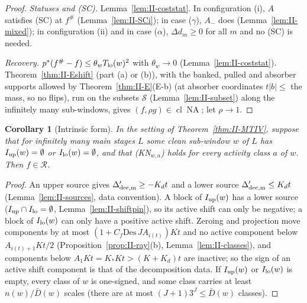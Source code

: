 \documentclass[10pt]{amsart}
\newtheorem{corollary}[theorem]{Corollary}
\theoremstyle{definition}
\theoremstyle{remark}
\newcommand{\NA}{\operatorname{NA}}
\newcommand{\cl}{\operatorname{cl}}
\newcommand{\Rec}{\mathcal R}
\begin{document}
\begin{proof}
\emph{Statuses and (SC).}  Lemma~\ref{lem:II-coststat}.  In configuration (i), $A$
satisfies (SC) at $f^\#$ (Lemma~\ref{lem:II-SCi}); in case ($\gamma$), $A_-$ does
(Lemma~\ref{lem:II-mixed}); in configuration (ii) and in case ($\alpha$), $\Delta d_m\ge0$
for all $m$ and no (SC) is needed.

\emph{Recovery.}  $p^*(f^\#-f)\le\theta_wT_{\rm lo}(w)^2$ with $\theta_w\to0$
(Lemma~\ref{lem:II-coststat}).  Theorem~\ref{thm:II-Eshift} (part (a) or (b)), with
the banked, pulled and absorber supports allowed by Theorem~\ref{thm:II-E}(E-b)
(at absorber coordinates $t|b|\le$ the mass, so no flips), run on the subsets $\mathcal S$
(Lemma~\ref{lem:II-subset}) along the infinitely many sub-windows, gives
$(f,\rho g)\in\cl\NA$; let $\rho\to1$.
\end{proof}

\begin{corollary}[Intrinsic form]\label{cor:II-MTIVintr}
In the setting of Theorem~\textup{\ref{thm:II-MTIV}}, suppose that for infinitely many
main stages $L$ some clean sub-window $w$ of $L$ has $I_{\rm up}(w)=\emptyset$ or $I_{\rm
lo}(w)=\emptyset$, and that \textup{(KN$_{w,a}$)} holds for every activity class $a$ of
$w$.  Then $f\in\Rec$.
\end{corollary}

\begin{proof}
An upper source gives $\Delta'_{\rm dec,m}\ge-K_dt$ and a lower source $\Delta'_{\rm dec,m}\le K_dt$
(Lemma~\ref{lem:II-sources}, data convention).  A block of $I_{\rm up}(w)$ has a lower
source ($I_{\rm up}\cap I_{\rm lo}=\emptyset$, Lemma~\ref{lem:II-shiftpin}), so its active shift can
only be negative; a block of $I_{\rm lo}(w)$ can only have a positive active shift.
Zeroing and projection move components by at most $(1+C_f\mathrm{Des}\,JA_{i(t)})Kt$
and no active component below $A_{i(t)+1}Kt/2$ (Proposition~\ref{prop:II-ray}(b),
Lemma~\ref{lem:II-classes}), and components below $A_1Kt=K_*Kt>(K+K_d)t$ are
inactive; so the sign of an active shift component is that of the
decomposition data.  If $I_{\rm up}(w)$ or $I_{\rm lo}(w)$ is empty, every class of $w$ is one-signed, and
some class carries at least $n(w)/\bar D(w)$ scales (there are at most
$(J+1)3^J\le\bar D(w)$ classes).
\end{proof}
\end{document}
